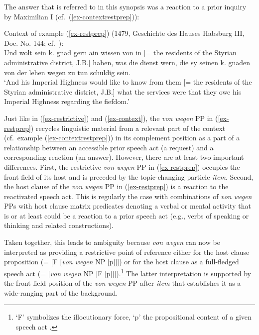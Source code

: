 \documentclass[output=paper
  ,nobabel
  ,draftmode
  ,babelshorthands
  ,colorlinks, citecolor=brown
]{langscibook}
\begin{document}
\noindent
The answer that is referred to in this synopsis was a reaction to a prior inquiry by Maximilian I (cf.\ (\ref{ex-contextrestprep})):

\ea\label{ex-contextrestprep} Context of example (\ref{ex-restprep})
(1479, Geschichte des Hauses Habsburg III, Doc. No. 144; cf.\ \citealp[330]{Chmel1858}):\\
\smallskip
Und wolt sein k. gnad gern ain wissen von in [= the residents of the Styrian administrative district, J.B.] haben, was die dienst wern, die sy seinen k. gnaden von der lehen wegen zu tun schuldig sein.\\
	`And his Imperial Highness would like to know from them [= the residents of the Styrian administrative district, J.B.] what the services were that they owe his Imperial Highness regarding the fiefdom.'
\z

\noindent
Just like in (\ref{ex-restrictive}) and (\ref{ex-context}), the \emph{von wegen} PP in  (\ref{ex-restprep}) recycles linguistic material from a relevant part of the context (cf.\ example (\ref{ex-contextrestprep})) in its complement position as a part of a relationship between an accessible prior speech act (a request) and a corresponding reaction (an answer). However, there are at least two important differences. First, the restrictive \emph{von wegen} PP in  (\ref{ex-restprep}) occupies the front field of its host and is preceded by the topic-changing  particle \emph{item}. Second, the host clause of the \emph{von wegen} PP in  (\ref{ex-restprep}) is a reaction to the reactivated speech act. This is regularly the case with combinations of \emph{von wegen} PPs with host clause matrix predicates denoting a verbal or mental activity that is or at least could be a reaction to a prior speech act (e.g., verbs of speaking or thinking and related constructions).

Taken together, this leads to ambiguity because \emph{von wegen} can now be interpreted as providing a restrictive point of reference either for the host clause proposition (= [F [\emph{von wegen} NP [p]]]) or for the host clause as a full-fledged speech act (= [\emph{von wegen} NP [F [p]]]).\footnote{`F' symbolizes the illocutionary force, `p' the propositional content of a given speech act \citep[cf.][31]{Searle1969}.} The latter interpretation is supported by the front field position of the \emph{von wegen} PP after \emph{item} that establishes it as a wide-ranging part of the background.
\end{document}
